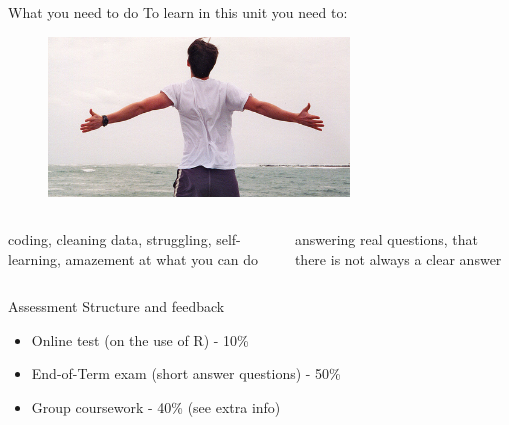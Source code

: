 \documentclass[
  ignorenonframetext,
]{beamer}
\begin{document}
\begin{frame}{What you need to do}
\protect\hypertarget{what-you-need-to-do}{}
To learn in this unit you need to:

\begin{figure}
    \centering
    \includegraphics[width=8cm]{Embrace.jpg}\\
\end{figure}

\hfill\break

\begin{columns}
  \begin{column}{0.5\textwidth}
    \textcolor{student}{coding, cleaning data, struggling, self-learning, amazement at what you can do}
  \end{column}
  \begin{column}{0.5\textwidth}
    \textcolor{student}{answering real questions, that there is not always a clear answer}
  \end{column}
    
\end{columns}
\end{frame}

\begin{frame}{Assessment Structure and feedback}
\protect\hypertarget{assessment-structure-and-feedback}{}
\begin{itemize}
  \item Online test (on the use of R) - 10\%
  \item End-of-Term exam (short answer questions) - 50\%
  \item Group coursework - 40\% (see extra info)

\end{itemize}
\end{frame}
\end{document}
